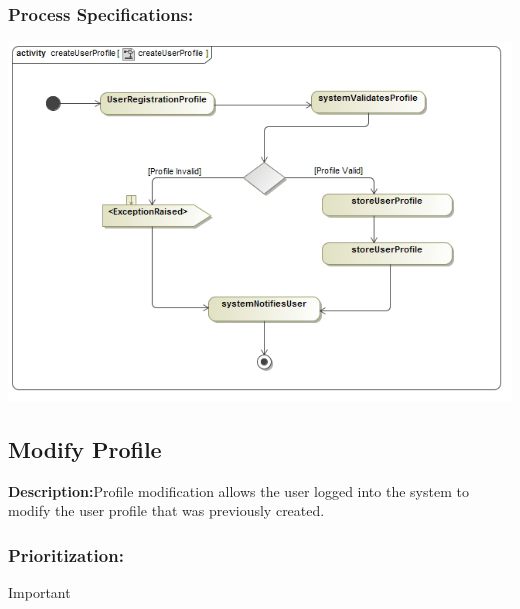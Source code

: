 \documentclass[a4paper,11pt]{article}
\begin{document}
\subsubsection{Process Specifications:} 
\includegraphics[width=1\linewidth]{./Images/UserProfile/CreateUserProfileActivity}

\subsection{Modify Profile}
\textbf{Description:}Profile modification allows the user logged into the system to modify the user profile that was previously created.
\subsubsection{Prioritization:}
\textbf{}Important
\end{document}
